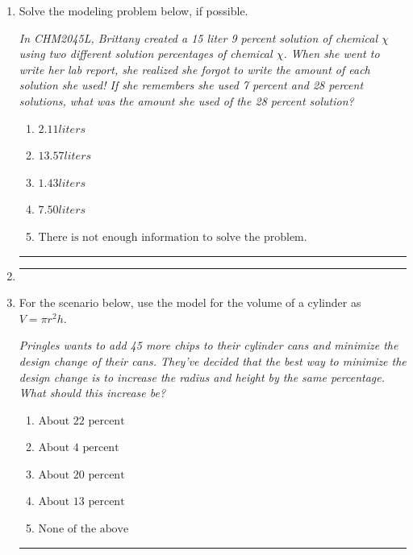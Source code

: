 \documentclass[14pt]{extbook}
\newcommand{\litem}[1]{\item#1\hspace*{-1cm}\rule{\textwidth}{0.4pt}}
\begin{document}
\begin{enumerate}
{\begin{enumerate}[label=\Alph*.]
\end{enumerate} }
\litem{
Solve the modeling problem below, if possible.
\begin{center}
    \textit{ In CHM2045L, Brittany created a 15 liter 9 percent solution of chemical $\chi$ using two different solution percentages of chemical $\chi$. When she went to write her lab report, she realized she forgot to write the amount of each solution she used! If she remembers she used 7 percent and 28 percent solutions, what was the amount she used of the 28 percent solution? }
\end{center}
\begin{enumerate}[label=\Alph*.]
\item \( 2.11 liters \)
\item \( 13.57 liters \)
\item \( 1.43 liters \)
\item \( 7.50 liters \)
\item \( \text{There is not enough information to solve the problem.} \)

\end{enumerate} }
\litem{
\begin{enumerate}[label=\Alph*.]

\end{enumerate} }
\litem{
For the scenario below, use the model for the volume of a cylinder as $V = \pi r^2 h$.
\begin{center}
    \textit{ Pringles wants to add 45 \text{percent} more chips to their cylinder cans and minimize the design change of their cans. They've decided that the best way to minimize the design change is to increase the radius and height by the same percentage. What should this increase be? }
\end{center}
\begin{enumerate}[label=\Alph*.]
\item \( \text{About } 22 \text{ percent} \)
\item \( \text{About } 4 \text{ percent} \)
\item \( \text{About } 20 \text{ percent} \)
\item \( \text{About } 13 \text{ percent} \)
\item \( \text{None of the above} \)


\end{enumerate}}
\end{enumerate}
\end{document}
